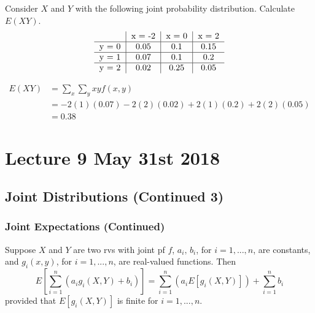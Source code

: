\documentclass[notoc,notitlepage]{tufte-book}
\begin{document}
\begin{eg}[Example 3.16]
  Consider $X$ and $Y$ with the following joint probability distribution. Calculate $E(XY)$.
  \[
  \begin{tabular}{c | c | c | c}
         & x = -2 & x = 0 & x = 2 \\
  \hline
  y = 0  & 0.05   & 0.1   & 0.15 \\
  \hline
  y = 1  & 0.07   & 0.1   & 0.2 \\
  \hline
  y = 2  & 0.02   & 0.25  & 0.05
  \end{tabular}
  \]

  \begin{solution}
    \begin{align*}
      E(XY) &= \sum_{x} \sum_{y} xy f(x, y) \\
        &= -2 (1) (0.07) - 2(2)(0.02) + 2(1)(0.2) + 2(2)(0.05) \\
        &= 0.38
    \end{align*}
  \end{solution}
\end{eg}




\chapter{Lecture 9 May 31st 2018}%
\label{chp:lecture_9_may_31st_2018}

\section{Joint Distributions (Continued 3)}%
\label{sec:joint_distributions_continued_3}

\subsection{Joint Expectations (Continued)}%
\label{sub:joint_expectations_continued}

\begin{thm}
\label{thm:linearity_of_expectation_in_bivariate_case}
  Suppose $X$ and $Y$ are two rvs with joint pf $f$, $a_i, \, b_i$, for $i = 1, ..., n$, are constants, and $g_i(x, y)$, for $i = 1, ..., n$, are real-valued functions. Then
  \begin{equation*}
    E\left[ \sum_{i=1}^{n} \left( a_i g_i (X, Y) + b_i \right) \right] = \sum_{i = 1}^{n} ( a_i E[ g_i(X, Y) ] ) + \sum_{i=1}^{n} b_i
  \end{equation*}
  provided that $E[g_i(X, Y)]$ is finite for $i = 1, ..., n$.
\end{thm}
\end{document}
